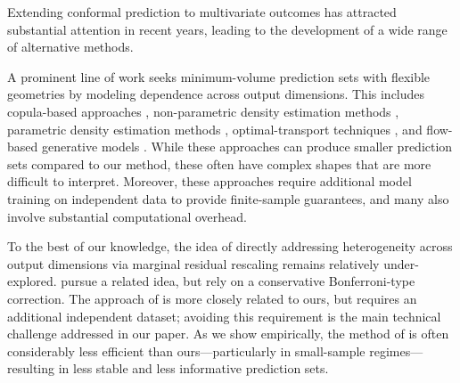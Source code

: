 Extending conformal prediction to multivariate outcomes has attracted substantial attention in recent years, leading to the development of a wide range of alternative methods.

A prominent line of work seeks minimum-volume prediction sets with flexible geometries by modeling dependence across output dimensions.
This includes copula-based approaches \citep{messoudi2021copula, pmlr-v258-park25c, sun2024copula}, non-parametric density estimation methods \citep{sadinle2016least,izbicki2022cdsplit,wang2023pcp, dheur2025unified}, parametric density estimation methods \citep{johnstone2021conformal,sampson2024conformal,braun2025minimum,braun2025multivariate},  optimal-transport techniques \citep{thurin2025otcp, klein2025multivariate}, and flow-based generative models \citep{colombo2024normalizing, lee2025flow, fang2025contra}. While these approaches can produce smaller prediction sets compared to our method, these often have complex shapes that are more difficult to interpret. Moreover, these approaches require additional model training on independent data to provide finite-sample guarantees, and many also involve substantial computational overhead.

To the best of our knowledge, the idea of directly addressing heterogeneity across output dimensions via marginal residual rescaling remains relatively under-explored. \citet{baheri2025multiscale} pursue a related idea, but rely on a conservative Bonferroni-type correction. The approach of \citet{sampson2024conformal} is more closely related to ours, but requires an additional independent dataset; avoiding this requirement is the main technical challenge addressed in our paper. As we show empirically, the method of \citet{baheri2025multiscale} is often considerably less efficient than ours—particularly in small-sample regimes—resulting in less stable and less informative prediction sets.

